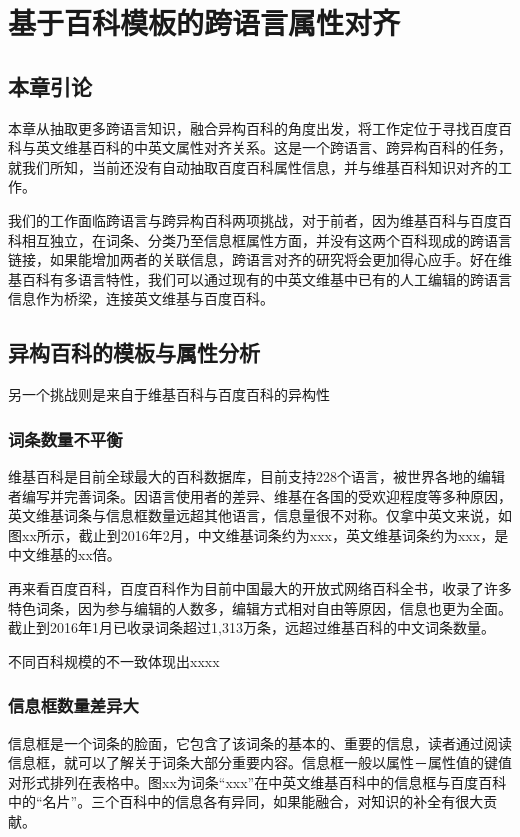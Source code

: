 \chapter{基于百科模板的跨语言属性对齐}
\label{cha:intro}

\section{本章引论}
本章从抽取更多跨语言知识，融合异构百科的角度出发，将工作定位于寻找百度百科与英文维基百科的中英文属性对齐关系。这是一个跨语言、跨异构百科的任务，就我们所知，当前还没有自动抽取百度百科属性信息，并与维基百科知识对齐的工作。

我们的工作面临跨语言与跨异构百科两项挑战，对于前者，因为维基百科与百度百科相互独立，在词条、分类乃至信息框属性方面，并没有这两个百科现成的跨语言链接，如果能增加两者的关联信息，跨语言对齐的研究将会更加得心应手。好在维基百科有多语言特性，我们可以通过现有的中英文维基中已有的人工编辑的跨语言信息作为桥梁，连接英文维基与百度百科。


\section{异构百科的模板与属性分析}
\label{sec:template-property-analysis}

另一个挑战则是来自于维基百科与百度百科的异构性

\subsection{词条数量不平衡}

维基百科是目前全球最大的百科数据库，目前支持228个语言，被世界各地的编辑者编写并完善词条。因语言使用者的差异、维基在各国的受欢迎程度等多种原因，英文维基词条与信息框数量远超其他语言，信息量很不对称。仅拿中英文来说，如图xx所示，截止到2016年2月，中文维基词条约为xxx，英文维基词条约为xxx，是中文维基的xx倍。

再来看百度百科，百度百科作为目前中国最大的开放式网络百科全书，收录了许多特色词条，因为参与编辑的人数多，编辑方式相对自由等原因，信息也更为全面。截止到2016年1月已收录词条超过1,313万条，远超过维基百科的中文词条数量。

不同百科规模的不一致体现出xxxx

\subsection{信息框数量差异大}

信息框是一个词条的脸面，它包含了该词条的基本的、重要的信息，读者通过阅读信息框，就可以了解关于词条大部分重要内容。信息框一般以属性－属性值的键值对形式排列在表格中。图xx为词条“xxx”在中英文维基百科中的信息框与百度百科中的“名片”。三个百科中的信息各有异同，如果能融合，对知识的补全有很大贡献。

